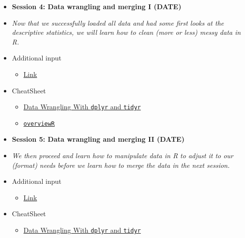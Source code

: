 \documentclass{article}
\begin{document}
\begin{itemize}
\vspace*{0.04in}
\noindent\rule{16cm}{0.7pt}
\vspace*{-0.45in}
\item[] \textbf{Session 4: Data wrangling and merging I (DATE)} 
\item[]\textit{Now that we successfully loaded all data and had some first looks at the descriptive statistics, we will learn how to clean (more or less) messy data in \textsf{R}.}
\item[] \faEdit \space Additional input
\begin{itemize} 
\item[$\square$] \href{url}{Link}
\end{itemize}
\item[] \faLightbulbO \space CheatSheet
\begin{itemize} 
\item[$\square$] \href{https://www.rstudio.com/wp-content/uploads/2015/02/data-wrangling-cheatsheet.pdf}{Data Wrangling With \texttt{dplyr} and \texttt{tidyr}}
\item[$\square$] \href{https://github.com/cosimameyer/overviewR/blob/master/man/figures/CheatSheet_overviewR.pdf}{\texttt{overviewR}}
\end{itemize}

\item[] \textbf{Session 5: Data wrangling and merging II (DATE)} 
\item[]\textit{We then proceed and learn how to manipulate data in \textsf{R} to adjust it to our (format) needs before we learn how to merge the data in the next session.}
\item[] \faEdit \space Additional input
\begin{itemize} 
\item[$\square$] \href{url}{Link}
\end{itemize}
\item[] \faLightbulbO \space CheatSheet
\begin{itemize} 
\item[$\square$] \href{https://www.rstudio.com/wp-content/uploads/2015/02/data-wrangling-cheatsheet.pdf}{Data Wrangling With \texttt{dplyr} and \texttt{tidyr}}
\end{itemize}


\end{itemize}
\end{document}
